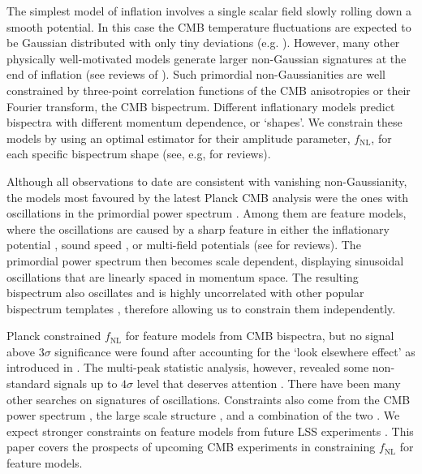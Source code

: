 The simplest model of inflation involves a single scalar field slowly rolling down a smooth potential. In this case the CMB temperature fluctuations are expected to be Gaussian distributed with only tiny deviations (e.g. \cite{Maldacena2013}). However, many other physically well-motivated models generate larger non-Gaussian signatures at the end of inflation (see reviews of \cite{Chen2010}). Such primordial non-Gaussianities are well constrained by three-point correlation functions of the CMB anisotropies or their Fourier transform, the CMB bispectrum. Different inflationary models predict bispectra with different momentum dependence, or `shapes'. We constrain these models by using an optimal estimator for their amplitude parameter,  $f_\text{NL}$,  for each specific bispectrum shape (see, e.g, \cite{Komatsu2010,Liguori2010} for reviews).

Although all observations to date are consistent with vanishing non-Gaussianity, the models most favoured by the latest Planck CMB analysis were the ones with oscillations in the primordial power spectrum \cite{PlanckCollaboration2015}. Among them are feature models, where the oscillations are caused by a sharp feature in either the inflationary potential \cite{starobinsky1992,Adams2001,Chen2007,Adshead2012,Hazra2014,Dvorkin2010}, sound speed \cite{Miranda2012,Bartolo2013}, or multi-field potentials \cite{Achucarro2011} (see \cite{Chen2010,Chluba2015} for reviews). The primordial power spectrum then becomes scale dependent, displaying sinusoidal oscillations that are linearly spaced in momentum space. The resulting bispectrum also oscillates and is highly uncorrelated with other popular bispectrum templates \cite{Meerburg2009}, therefore allowing us to constrain them independently.

Planck constrained $f_\text{NL}$ for feature models from CMB bispectra, but no signal above $3\sigma$ significance were found after accounting for the `look elsewhere effect' as introduced in \cite{Fergusson2015a}. The multi-peak statistic analysis, however, revealed some non-standard signals up to $4\sigma$ level that deserves attention \cite{PlanckCollaboration2015}. There have been many other searches on signatures of oscillations. Constraints also come from the CMB power spectrum \cite{Martin2004,Benetti2011,Meerburg2012,Meerburg2014a,Meerburg2014,Fergusson2015b}, the large scale structure \cite{Chantavat2011,Ballardini2016}, and a combination of the two \cite{Hu2015,Benetti2016}. We expect stronger constraints on feature models from future LSS experiments \cite{Chen2016}. This paper covers the prospects of upcoming CMB experiments in constraining $f_\text{NL}$ for feature models.

